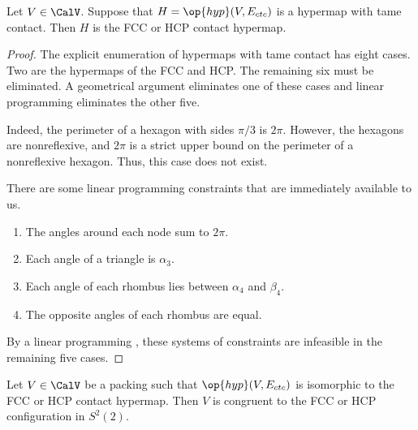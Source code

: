 \begin{lemma}[]\label{lemma:fcc-ft} Let $V\in \CalV$.
  Suppose that $H=\op{hyp}(V,E_{ctc})$ is a hypermap with tame
  contact.  Then $H$ is the FCC or HCP contact hypermap.
\end{lemma}

\begin{proof} The explicit enumeration of hypermaps with tame
  contact has eight cases.  Two are the hypermaps of the
  FCC and HCP.  The remaining six must be eliminated.  
A geometrical argument  eliminates one of these cases and linear programming
eliminates the other five.

  Indeed, the perimeter of a hexagon with sides $\pi/3$
is $2\pi$.  However, the hexagons are nonreflexive, and $2\pi$ is a strict upper bound on the perimeter of a nonreflexive
hexagon.  Thus, this case does not exist.

\figCXFENOK %


There are some linear
  programming constraints that are immediately available to us.
\begin{enumerate}\wasitemize 
\item The angles around each node sum to $2\pi$.
\item Each angle of a triangle is $\alpha_3$.
\item Each angle of each rhombus lies between $\alpha_4$ and $\beta_4$.
\item The opposite angles of each rhombus are equal.
\end{enumerate}\wasitemize 
By a linear programming ,
these systems of constraints are infeasible in the remaining five cases.
\end{proof}


\begin{lemma}[]\label{lemma:kiss-fcc}
  Let $V\in \CalV$ be a packing such that $\op{hyp}(V,E_{ctc})$ is
  isomorphic to the FCC or HCP contact hypermap.  Then $V$ is
  congruent to the FCC or HCP configuration in $S^2(2)$.
\end{lemma}
%
%
%
%
%

